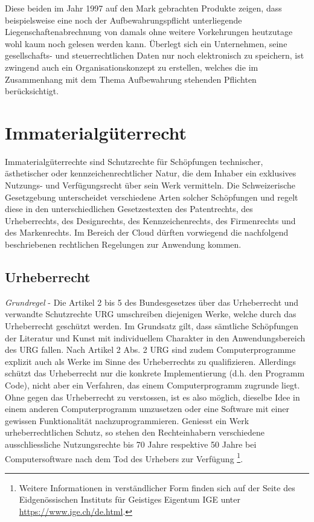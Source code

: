 \documentclass[a4paper,pointlessnumbers]{scrreprt}
\begin{document}
Diese beiden im Jahr 1997 auf den Mark gebrachten Produkte zeigen, dass beispielsweise eine noch der Aufbewahrungspflicht unterliegende Liegenschaftenabrechnung von damals ohne weitere Vorkehrungen heutzutage wohl kaum noch gelesen werden kann. Überlegt sich ein Unternehmen, seine gesellschafts- und steuerrechtlichen Daten nur noch elektronisch zu speichern, ist zwingend auch ein Organisationskonzept zu erstellen, welches die im Zusammenhang mit dem Thema Aufbewahrung stehenden Pflichten berücksichtigt.

\pagebreak

\section{Immaterialgüterrecht}
Immaterialgüterrechte sind Schutzrechte für Schöpfungen technischer, ästhetischer oder kennzeichenrechtlicher Natur, die dem Inhaber ein exklusives Nutzungs- und Verfügungsrecht über sein Werk vermitteln. Die Schweizerische Gesetzgebung unterscheidet verschiedene Arten solcher Schöpfungen und regelt diese in den unterschiedlichen Gesetzestexten des Patentrechts, des Urheberrechts, des Designrechts, des Kennzeichenrechts, des Firmenrechts und des Markenrechts. Im Bereich der Cloud dürften vorwiegend die nachfolgend beschriebenen rechtlichen Regelungen zur Anwendung kommen.


\subsection{Urheberrecht}
\textit{Grundregel} - Die Artikel 2 bis 5 des Bundesgesetzes über das Urheberrecht und verwandte Schutzrechte URG umschreiben diejenigen Werke, welche durch das Urheberrecht geschützt werden. Im Grundsatz gilt, dass \glqq sämtliche Schöpfungen der Literatur und Kunst mit individuellem Charakter\grqq{} in den Anwendungsbereich des URG fallen. Nach Artikel 2 Abs. 2 URG sind zudem Computerprogramme explizit auch als Werke im Sinne des Urheberrechts zu qualifizieren. Allerdings schützt das Urheberrecht nur die konkrete Implementierung (d.h. den Programm Code), nicht aber ein Verfahren, das einem Computerprogramm zugrunde liegt. Ohne gegen das Urheberrecht zu verstossen, ist es also möglich, dieselbe Idee in einem anderen Computerprogramm umzusetzen oder eine Software mit einer gewissen Funktionalität nachzuprogrammieren. Geniesst ein Werk urheberrechtlichen Schutz, so stehen den Rechteinhabern verschiedene ausschliessliche Nutzungsrechte bis 70 Jahre respektive 50 Jahre bei Computersoftware nach dem Tod des Urhebers zur Verfügung \footnote{Weitere Informationen in verständlicher Form finden sich auf der Seite des Eidgenössischen Instituts für Geistiges Eigentum IGE unter \href{https://www.ige.ch/de.html}{https://www.ige.ch/de.html}.}.
\end{document}

